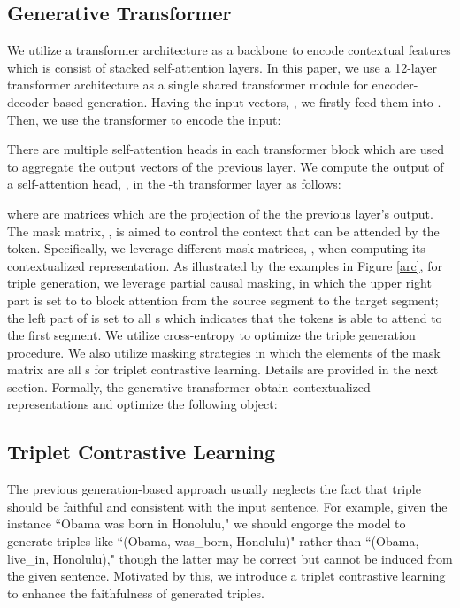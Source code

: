 \documentclass[letterpaper]{article} \usepackage{aaai21}  \usepackage{times}  \usepackage{helvet} \usepackage{courier}  \usepackage[hyphens]{url}  \usepackage{graphicx} \urlstyle{rm} \def\UrlFont{\rm}  \usepackage{natbib}  \usepackage[noend]{algpseudocode}
\begin{document}
\subsection{Generative Transformer}

We utilize a  transformer architecture as a backbone to encode contextual features which is consist of stacked self-attention layers. In this paper, we use a 12-layer transformer architecture as a single shared transformer module for encoder-decoder-based generation. Having the input vectors, , we firstly feed them into . Then, we use the transformer to encode the input:
 

There are multiple self-attention heads in each transformer block which are used to aggregate the output vectors of the previous layer. We compute the output of a self-attention head, , in the -th transformer layer as follows:






where  are  matrices which are the  projection of the the previous layer’s output.
The mask matrix, , is aimed to control the context that can be attended by the token. Specifically, we leverage different mask matrices, ,  when computing its contextualized representation. 
As illustrated by the examples in Figure \ref{arc}, for triple generation, we leverage partial causal masking, in which  the upper right part is set to  to block attention from the source segment to the target segment; the left part of  is set to all s which indicates that the tokens is able to attend to the first segment. We utilize cross-entropy  to optimize the triple generation procedure. We also utilize masking strategies in which the elements of the mask matrix are all s for triplet contrastive learning. Details are provided in the next section. Formally, the generative transformer obtain contextualized representations and optimize the following object:




\subsection{Triplet Contrastive Learning}
The previous generation-based approach usually neglects the fact that triple should be faithful and consistent with the input sentence. For example, given the instance ``Obama was born in Honolulu," we should engorge the model to generate triples like ``(Obama, was\_born, Honolulu)" rather than ``(Obama, live\_in, Honolulu)," though the latter may be correct but cannot be induced from the given sentence. Motivated by this, we introduce a triplet contrastive learning to enhance the faithfulness of generated triples.
\end{document}
